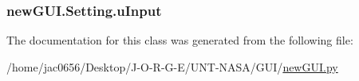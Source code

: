 \subsubsection[{\texorpdfstring{u\+Input}{uInput}}]{\setlength{\rightskip}{0pt plus 5cm}new\+G\+U\+I.\+Setting.\+u\+Input}\hypertarget{classnewGUI_1_1Setting_a4442284c24134df533b4e8c9bc0896a8}{}\label{classnewGUI_1_1Setting_a4442284c24134df533b4e8c9bc0896a8}


The documentation for this class was generated from the following file\+:\begin{DoxyCompactItemize}
\item 
/home/jac0656/\+Desktop/\+J-\/\+O-\/\+R-\/\+G-\/\+E/\+U\+N\+T-\/\+N\+A\+S\+A/\+G\+U\+I/\hyperlink{newGUI_8py}{new\+G\+U\+I.\+py}\end{DoxyCompactItemize}
